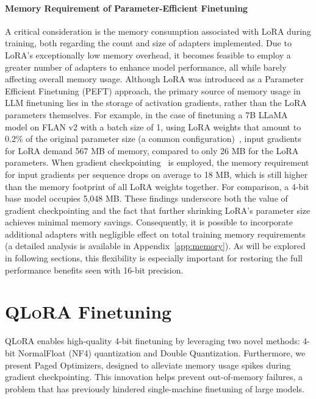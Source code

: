 \paragraph{Memory Requirement of Parameter-Efficient Finetuning} A critical consideration is the memory consumption associated with LoRA during training, both regarding the count and size of adapters implemented. Due to LoRA’s exceptionally low memory overhead, it becomes feasible to employ a greater number of adapters to enhance model performance, all while barely affecting overall memory usage. Although LoRA was introduced as a Parameter Efficient Finetuning (PEFT) approach, the primary source of memory usage in LLM finetuning lies in the storage of activation gradients, rather than the LoRA parameters themselves. For example, in the case of finetuning a 7B LLaMA model on FLAN v2 with a batch size of 1, using LoRA weights that amount to 0.2\% of the original parameter size (a common configuration)~\citep{hu2021lora,liu2022few}, input gradients for LoRA demand 567 MB of memory, compared to only 26 MB for the LoRA parameters. When gradient checkpointing~\citep{chen2016training} is employed, the memory requirement for input gradients per sequence drops on average to 18 MB, which is still higher than the memory footprint of all LoRA weights together. For comparison, a 4-bit base model occupies 5,048 MB. These findings underscore both the value of gradient checkpointing and the fact that further shrinking LoRA’s parameter size achieves minimal memory savings. Consequently, it is possible to incorporate additional adapters with negligible effect on total training memory requirements (a detailed analysis is available in Appendix~\ref{app:memory}). As will be explored in following sections, this flexibility is especially important for restoring the full performance benefits seen with 16-bit precision.

\section{\textsc{QLoRA} Finetuning}

\textsc{QLoRA} enables high-quality 4-bit finetuning by leveraging two novel methods: 4-bit NormalFloat (NF4) quantization and Double Quantization. Furthermore, we present Paged Optimizers, designed to alleviate memory usage spikes during gradient checkpointing. This innovation helps prevent out-of-memory failures, a problem that has previously hindered single-machine finetuning of large models.

